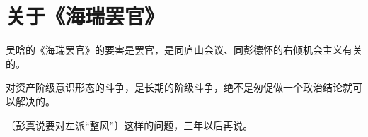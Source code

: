 \section[关于《海瑞罢官》（一九六六年二月八日）]{关于《海瑞罢官》}


吴晗的《海瑞罢官》的要害是罢官，是同庐山会议、同彭德怀的右倾机会主义有关的。

对资产阶级意识形态的斗争，是长期的阶级斗争，绝不是匆促做一个政治结论就可以解决的。

〔彭真说要对左派“整风”〕这样的问题，三年以后再说。


